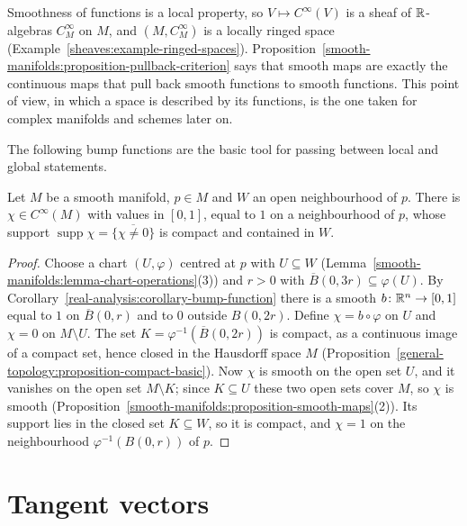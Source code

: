 \begin{remark}\label{smooth-manifolds:remark-ringed-space}
Smoothness of functions is a local property, so $V \mapsto C^\infty(V)$ is a sheaf of $\mathbb{R}$-algebras $C^\infty_M$ on $M$, and $(M, C^\infty_M)$ is a locally
ringed space (Example~\ref{sheaves:example-ringed-spaces}). Proposition~\ref{smooth-manifolds:proposition-pullback-criterion} says that smooth maps are exactly the
continuous maps that pull back smooth functions to smooth functions. This point of view, in which a space is described by its functions, is the one taken for
complex manifolds and schemes later on.
\end{remark}

The following bump functions are the basic tool for passing between local and global statements.

\begin{lemma}\label{smooth-manifolds:lemma-bump-manifold}
Let $M$ be a smooth manifold, $p \in M$ and $W$ an open neighbourhood of $p$. There is $\chi \in C^\infty(M)$ with values in $[0, 1]$, equal to $1$ on a
neighbourhood of $p$, whose support $\operatorname{supp}\chi = \overline{\{\chi \neq 0\}}$ is compact and contained in $W$.
\end{lemma}

\begin{proof}
Choose a chart $(U, \varphi)$ centred at $p$ with $U \subseteq W$ (Lemma~\ref{smooth-manifolds:lemma-chart-operations}(3)) and $r > 0$ with
$\overline{B}(0, 3r) \subseteq \varphi(U)$. By Corollary~\ref{real-analysis:corollary-bump-function} there is a smooth $b \colon \mathbb{R}^n \to [0, 1]$ equal to $1$ on
$\overline{B}(0, r)$ and to $0$ outside $B(0, 2r)$. Define $\chi = b \circ \varphi$ on $U$ and $\chi = 0$ on $M \setminus U$. The set
$K = \varphi^{-1}(\overline{B}(0, 2r))$ is compact, as a continuous image of a compact set, hence closed in the Hausdorff space $M$
(Proposition~\ref{general-topology:proposition-compact-basic}). Now $\chi$ is smooth on the open set $U$, and it vanishes on the open set $M \setminus K$; since
$K \subseteq U$ these two open sets cover $M$, so $\chi$ is smooth (Proposition~\ref{smooth-manifolds:proposition-smooth-maps}(2)). Its support lies in the
closed set $K \subseteq W$, so it is compact, and $\chi = 1$ on the neighbourhood $\varphi^{-1}(B(0, r))$ of $p$.
\end{proof}

\section{Tangent vectors}\label{smooth-manifolds:section-tangent}

